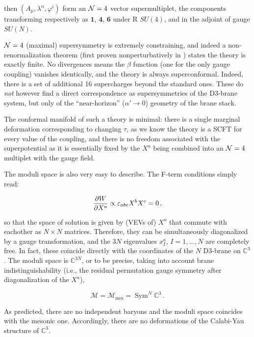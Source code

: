 then $(A_\mu,\lambda^\alpha,\varphi^i)$ form an $\mathcal{N}=4$ vector supermultiplet, the components transforming respectively as $\mathbf{1}$, $\mathbf{4}$, $\mathbf{6}$ under R $SU(4)$, and in the adjoint of gauge $SU(N)$.

$\mathcal{N} = 4$ (maximal) supersymmetry is extremely constraining, and indeed a non-renormalization theorem (first proven nonperturbatively in \cite{seibergnr}) states the theory is exactly finite. No divergences means the $\beta$ function (one for the only gauge coupling) vanishes identically, and the theory is always superconformal. Indeed, there is a set of additional 16 supercharges beyond the standard ones. These do \emph{not} however find a direct correspondence as supersymmetries of the D3-brane system, but only of the ``near-horizon'' ($\alpha' \rightarrow 0$) geometry of the brane stack.

The conformal manifold of such a theory is minimal: there is a single marginal deformation corresponding to changing $\tau$, as we know the theory is a SCFT for every value of the coupling, and there is no freedom associated with the superpotential as it is essentially fixed by the $X^a$ being combined into an $\mathcal{N} = 4$ multiplet with the gauge field.

The moduli space is also very easy to describe. The F-term conditions simply read:

\begin{equation}
	\frac{\partial W}{\partial X^a} \propto \varepsilon_{abc} X^b X^c = 0\,,
	\label{}
\end{equation}

so that the space of solution is given by (VEVs of) $X^a$ that commute with eachother as $N\times N$ matrices. Therefore, they can be simultaneously diagonalized by a gauge transformation, and the $3N$ eigenvalues $x^a_I$, $I=1,\ldots,N$ are completely free. In fact, these coincide directly with the coordinates of the $N$ D3-brane on $\mathbb{C}^3$. The moduli space is $\mathbb{C}^{3N}$, or to be precise, taking into account brane indistinguishability (i.e., the residual permutation gauge symmetry after diagonalization of the $X^a$),

\begin{equation}
	\mathcal{M} = \mathcal{M}_\text{mes} = \operatorname{Sym}^N \mathbb{C}^3\,.
	\label{}
\end{equation}

As predicted, there are no independent baryons and the moduli space coincides with the mesonic one. Accordingly, there are no deformations of the Calabi-Yau structure of $\mathbb{C}^3$.

